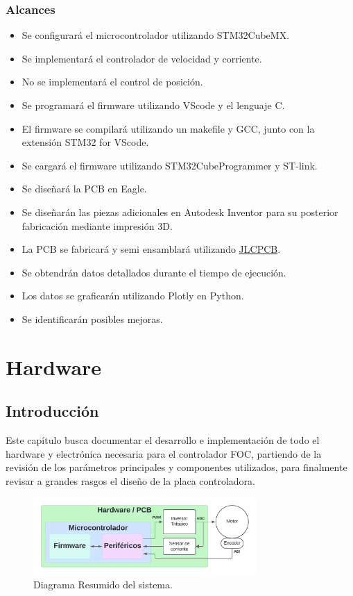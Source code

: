 \documentclass[11pt]{report}
\begin{document}
\subsection{Alcances}
\begin{itemize}
	\item Se configurará el microcontrolador utilizando STM32CubeMX.
	\item Se implementará el controlador de velocidad y corriente.
	\item No se implementará el control de posición.
	\item Se programará el firmware utilizando VScode y el lenguaje C.
	\item El firmware se compilará utilizando un makefile y GCC, junto con la extensión STM32 for VScode.
	\item Se cargará el firmware utilizando STM32CubeProgrammer y ST-link.
	\item Se diseñará la PCB en Eagle.
	\item Se diseñarán las piezas adicionales en Autodesk Inventor para su posterior fabricación mediante impresión 3D.
	\item La PCB se fabricará y semi ensamblará utilizando \href{https://www.youtube.com/watch?v=riT4nl0T8_M}{JLCPCB}.
	\item Se obtendrán datos detallados durante el tiempo de ejecución.
	\item Los datos se graficarán utilizando Plotly en Python.
	\item Se identificarán posibles mejoras.
\end{itemize}

\chapter{Hardware}
\section{Introducción}
Este capítulo busca documentar el desarrollo e implementación de todo el hardware y electrónica necesaria para el controlador FOC, partiendo de la revisión de los parámetros principales y componentes utilizados, para finalmente revisar a grandes rasgos el diseño de la placa controladora.


\begin{figure}[ht]
	\centering
	\includegraphics[width=0.76\textwidth]{imagenes/Diagramas/Diagramas - ultra resumen.png}
	\caption{Diagrama Resumido del sistema.}
	\label{flujo_resumen}
\end{figure}
\FloatBarrier
\end{document}
